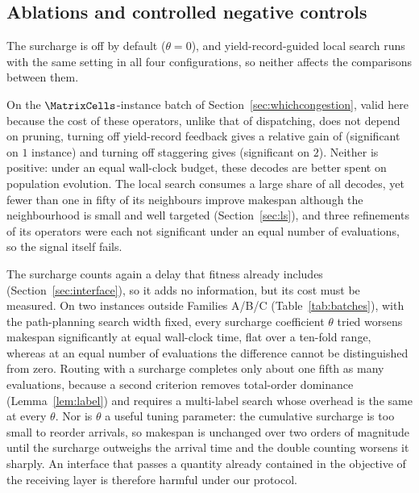 \subsection{Ablations and controlled negative controls}
\label{sec:pricing}

The surcharge is off by default ($\theta=0$), and yield-record-guided local search runs with the same setting in all four configurations, so neither affects the comparisons between them.

On the $\MatrixCells$-instance batch of Section~\ref{sec:whichcongestion}, valid here because the cost of these operators, unlike that of dispatching, does not depend on pruning, turning off yield-record feedback gives a relative gain of \GainCertMatrix{} (significant on $1$ instance) and turning off staggering gives \GainStaggerMatrix{} (significant on $2$). Neither is positive: under an equal wall-clock budget, these decodes are better spent on population evolution. The local search consumes a large share of all decodes, yet fewer than one in fifty of its neighbours improve makespan although the neighbourhood is small and well targeted (Section~\ref{sec:ls}), and three refinements of its operators were each not significant under an equal number of evaluations, so the signal itself fails.

The surcharge counts again a delay that fitness already includes (Section~\ref{sec:interface}), so it adds no information, but its cost must be measured. On two instances outside Families A/B/C (Table~\ref{tab:batches}), with the path-planning search width fixed, every surcharge coefficient $\theta$ tried worsens makespan significantly at equal wall-clock time, flat over a ten-fold range, whereas at an equal number of evaluations the difference cannot be distinguished from zero. Routing with a surcharge completes only about one fifth as many evaluations, because a second criterion removes total-order dominance (Lemma~\ref{lem:label}) and requires a multi-label search whose overhead is the same at every $\theta$. Nor is $\theta$ a useful tuning parameter: the cumulative surcharge is too small to reorder arrivals, so makespan is unchanged over two orders of magnitude until the surcharge outweighs the arrival time and the double counting worsens it sharply. An interface that passes a quantity already contained in the objective of the receiving layer is therefore harmful under our protocol.

